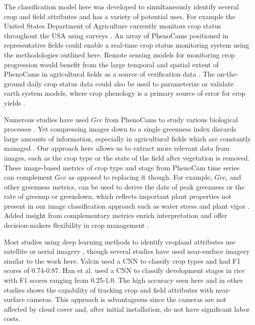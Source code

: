 \documentclass[remotesensing,article,submit,moreauthors,pdftex]{Definitions/mdpi}
\begin{document}
The classification model here was developed to simultaneously identify several crop and field attributes and has a variety of potential uses. For example the United States Department of Agriculture currently monitors crop status throughout the USA using surveys \citep{nass2012}. An array of PhenoCams positioned in representative fields could enable a real-time crop status monitoring system using the methodologies outlined here. Remote sensing models for monitoring crop progression would benefit from the large temporal and spatial extent of PhenoCams in agricultural fields as a source of verification data \citep{gao-zhang2021}. The on-the-ground  daily crop status data could also be used to parameterize or validate earth system models, where crop phenology is a primary source of error for crop yields \citep{lombardozzi2020}.  

Numerous studies have used $Gcc$ from PhenoCams to study various biological processes \citep{richardson2018b, richardson2019}. Yet compressing images down to a single greenness index discards large amounts of information, especially in agricultural fields which are constantly managed \citep{browning2021}. Our approach here allows us to extract more relevant data from images, such as the crop type or the state of the field after vegetation is removed. These image-based metrics of crop type and stage from PhenoCam time series can complement $Gcc$ as opposed to replacing it though. For example, $Gcc$, and other greenness metrics, can be used to derive the date of peak greenness or the rate of greenup or greendown, which reflects important plant properties not present in our image classification approach such as water stress and plant vigor \citep{sakamoto2010, aasen2020, liu2022}. Added insight from complementary metrics enrich interpretation and offer decision-makers flexibility in crop management \citep{browning2021}.  

Most studies using deep learning methods to identify cropland attributes use satellite or aerial imagery \citep{benos2021}, though several studies have used near-surface imagery similar to the work here. Yalcin \citeyear{yalcin2017} used a CNN to classify crop types and had F1 scores of 0.74-0.87. Han et al. \citeyear{han-shi2021} used a CNN to classify development stages in rice with F1 scores ranging from 0.25-1.0.  The high accuracy seen here and in other studies shows the capability of tracking crop and field attributes with near-surface cameras. This approach is advantageous since the cameras are not affected by cloud cover and, after initial installation, do not have significant labor costs. 
\end{document}
